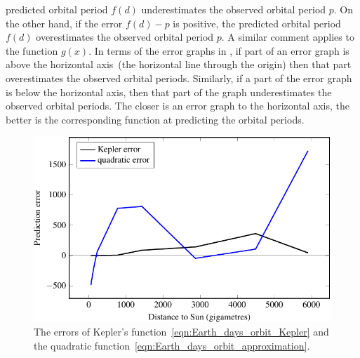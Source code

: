 \documentclass[a4paper,oneside,12pt]{article}
\begin{document}
\begin{problem}
{\begin{solution}
predicted orbital period $f(d)$ underestimates the observed orbital
period $p$.  On the other hand, if the error $f(d) - p$ is positive,
the predicted orbital period $f(d)$ overestimates the observed orbital
period $p$.  A similar comment applies to the function $g(x)$.  In
terms of the error graphs in
, if part of an error graph
is above the horizontal axis~(the horizontal line through the origin)
then that part overestimates the observed orbital periods.  Similarly,
if a part of the error graph is below the horizontal axis, then that
part of the graph underestimates the observed orbital periods.  The
closer is an error graph to the horizontal axis, the better is the
corresponding function at predicting the orbital periods.

\begin{table}[!htbp]
\centering

\caption{%
  The orbital period of a planet as a function of its distance~(in
  gigametres) to the Sun.  This is the same as
  , but missing entries have been
  filled in.  All numbers in the fourth and fifth columns have been
  rounded to one decimal place.  The sixth and seventh columns list,
  respectively, the errors of Kepler's
   and the quadratic
  .  Numbers in these
  columns have been rounded to two decimal places.  Note that most
  numbers in the table have been rounded in order to fit the table.
  However, you should not round these intermediate results when you
  use them to calculate the root mean square errors.
}
\label{tab:planet_orbital_periods_errors}
\end{table}

\begin{figure}[!htbp]
\centering
\includegraphics[scale=1.1]{image/09/period-error.pdf}
\caption{%
  The errors of Kepler's function~\eqref{eqn:Earth_days_orbit_Kepler}
  and the quadratic
  function~\eqref{eqn:Earth_days_orbit_approximation}.
}
\label{fig:orbital_periods_error_analysis}
\end{figure}


\end{solution}}
\end{problem}
\end{document}
